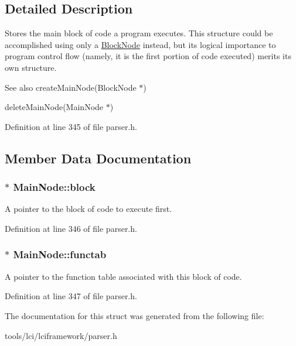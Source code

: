 \subsection{Detailed Description}
Stores the main block of code a program executes. This structure could be accomplished using only a \hyperlink{struct_block_node}{Block\-Node} instead, but its logical importance to program control flow (namely, it is the first portion of code executed) merits its own structure.

\begin{DoxySeeAlso}{See also}
create\-Main\-Node(\-Block\-Node $\ast$) 

delete\-Main\-Node(\-Main\-Node $\ast$) 
\end{DoxySeeAlso}


Definition at line 345 of file parser.\-h.



\subsection{Member Data Documentation}
\hypertarget{struct_main_node_aee302d107abb16c48702c2699a58d49f}{
\subsubsection[{block}]{$\ast$ {\bf Main\-Node\-::block}}}\label{struct_main_node_aee302d107abb16c48702c2699a58d49f}
A pointer to the block of code to execute first. 

Definition at line 346 of file parser.\-h.

\hypertarget{struct_main_node_a1b22e4833219bb71c9ca7f32d3e37241}{
\subsubsection[{functab}]{$\ast$ {\bf Main\-Node\-::functab}}}\label{struct_main_node_a1b22e4833219bb71c9ca7f32d3e37241}
A pointer to the function table associated with this block of code. 

Definition at line 347 of file parser.\-h.



The documentation for this struct was generated from the following file\-:\begin{DoxyCompactItemize}
\item 
tools/lci/lciframework/parser.\-h\end{DoxyCompactItemize}
